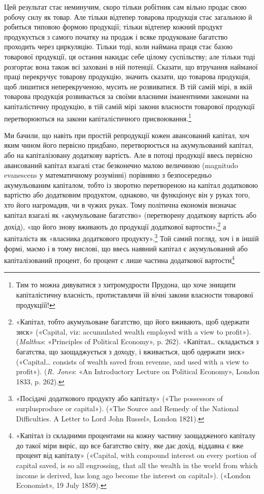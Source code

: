 Цей результат стає неминучим, скоро тільки робітник сам
вільно продає свою робочу силу як товар. Але тільки відтепер товарова
продукція стає загальною й робиться типовою формою продукції;
тільки відтепер кожний продукт продукується з самого
початку на продаж і всяке продуковане багатство проходить через
циркуляцію. Тільки тоді, коли наймана праця стає базою товарової
продукції, ця остання накидає себе цілому суспільству;
але тільки тоді розгортає вона також всі заховані в ній потенції.
Сказати, що втручання найманої праці перекручує товарову
продукцію, значить сказати, що товарова продукція, щоб лишитися
неперекрученою, мусить не розвиватися. В тій самій мірі,
в якій товарова продукція розвивається за своїми власними
іманентними законами на капіталістичну продукцію, в тій самій
мірі закони власности товарової продукції перетворюються на
закони капіталістичного присвоювання.\footnote{
Тим то можна дивуватися з хитромудрости Прудона, що хоче знищити
капіталістичну власність, протиставлячи їй вічні закони власности
товарової продукціїї!
}

Ми бачили, що навіть при простій репродукції кожен авансований
капітал, хоч яким чином його первісно придбано, перетворюється
на акумульований капітал, або на капіталізовану
додаткову вартість. Але в потоці продукції ввесь первісно авансований
капітал взагалі стає безконечно малою величиною (magnitudo
evanescens у математичному розумінні) порівняно з безпосередньо
акумульованим капіталом, тобто із зворотно перетвореною
на капітал додатковою вартістю або додатковим продуктом,
однаково, чи функціонує він у руках того, хто його нагромадив,
чи в чужих руках. Тому політична економія визначає капітал
взагалі як «акумульоване багатство» (перетворену додаткову
вартість або дохід), «що його знову вживають до продукції додаткової
вартости»,\footnote{
«Капітал, тобто акумульоване багатство, що його вживають, щоб
одержати зиск» («Capital, viz: accumulated wealth employed with a
view to profit»). (\emph{Malthus}: «Principles of Political Economy», p. 262).
«Капітал\dots{} складається з багатства, що заощаджується з доходу, і вживається,
щоб одержати зиск» («Capital\dots{} consists of wealth saved from
revenue, and used with a view to profit»). (\emph{R. Jones}: «An Introductory
Lecture on Political Economy», London 1833, p. 262).
} а капіталіста як «власника додаткового
продукту».\footnote{
«Посідачі додаткового продукту або капіталу» («The possessors
of surplusproduce or capital»). («The Source and Remedy of the National
Difficulties. A Letter to Lord John Russel», London 1821).
} Той самий погляд, хоч і в іншій формі, маємо і
в тому вислові, що ввесь наявний капітал є акумульований або
капіталізований процент, бо процент є лише частина додаткової
вартости\footnote{
«Капітал із складними процентами на кожну частину заощадженого
капіталу до такої міри виріс, що все багатство світу, яке дає дохід,
віддавна є вже процент від капіталу» («Capital, with compound interest
on every portion of capital saved, is so all engrossing, that all the wealth
in the world from which income is derived, has long ago become the
interest on capital»). («London Economist», 19 July 1859).
}
